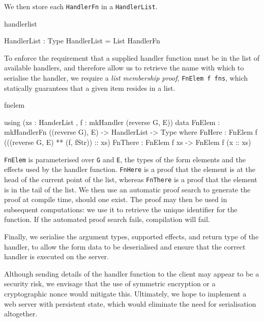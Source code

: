 \noindent
We then store each \texttt{HandlerFn} in a \texttt{HandlerList}.

\begin{SaveVerbatim}{handlerlist}

HandlerList : Type
HandlerList = List HandlerFn

\end{SaveVerbatim}

\noindent
To enforce the requirement that a supplied handler function must be in the
list of available handlers, and therefore allow us to retrieve the name with
which to serialise the handler, we require a \textit{list membership proof},
\texttt{FnElem f fns}, which statically guarantees that a given item resides in
a list.

\begin{SaveVerbatim}{fnelem}

using (xs : HanderList , f : mkHandler (reverse G, E))
  data FnElem : mkHandlerFn ((reverse G), E) -> 
                HandlerList -> Type where
       FnHere  : FnElem f (((reverse G, E) ** 
                                  (f, fStr)) :: xs)
       FnThere : FnElem f xs -> FnElem f (x :: xs)
       
\end{SaveVerbatim}

\noindent
\texttt{FnElem} is parameterised over \texttt{G} and \texttt{E}, the types of the
form elements and the effects used by the handler function. \texttt{FnHere}
is a proof that the element is at the head of the current point of the list,
whereas \texttt{FnThere} is a proof that the element is in the tail of 
the list. 
We then use an automatic proof search to
generate the proof at compile time, should one exist. The proof
may then be used in subsequent computations: we use it to retrieve
the unique identifier for the function. If the automated proof search fails,
compilation will fail.

Finally, we serialise the argument types, supported effects, and return
type of the handler, to allow the form data to be 
deserialised and ensure that the correct handler is executed on the
server. 

Although sending details of the handler function to the client may appear to be
a security risk, we envisage that the use of symmetric encryption or a
cryptographic nonce would mitigate this. Ultimately, we hope to implement a
web server with persistent state, which would eliminate the need for
serialisation altogether.

